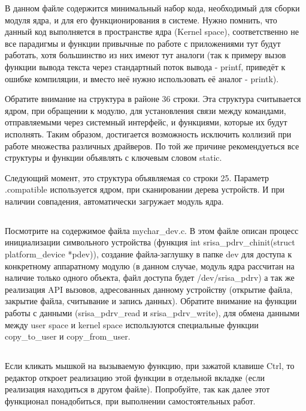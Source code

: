 В данном файле содержится минимальный набор кода, необходимый для сборки модуля ядра, и для его функционирования в системе. Нужно помнить, что данный код выполняется в пространстве ядра (Kernel space), соответственно не все парадигмы и функции привычные по работе с приложениями тут будут работать, хотя большинство из них имеют тут аналоги (так к примеру вызов функции вывода текста через стандартный поток вывода - printf, приведёт к ошибке компиляции, и вместо неё нужно использовать её аналог - printk).

Обратите внимание на структура в районе 36 строки. Эта структура считывается ядром, при обращении к модулю, для установления связи между командами, отправляемыми через системный интерфейс, и функциями, которые их будут исполнять. Таким образом, достигается возможность исключить коллизий при работе множества различных драйверов. По той же причине рекомендуеться  все структуры и функции объявлять с ключевым словом static.

Следующий момент, это структура объявляемая со строки 25. Параметр .compatible используется ядром, при сканировании дерева устройств. И при наличии совпадения, автоматически загружает модуль ядра.  

\subsection{}Посмотрите на содержимое файла mychar\_dev.c. В этом файле описан процесс инициализации символьного устройства (функция int srisa\_pdrv\_chinit(struct platform\_device *pdev)), создание файла-заглушку в папке dev для доступа к конкретному аппаратному модулю (в данном случае, модуль ядра рассчитан на наличие только одного объекта, файл доступа будет /dev/srisa\_pdrv) а так же реализация API вызовов, адресованных данному устройству (открытие файла, закрытие файла, считывание и запись данных).
Обратите внимание на функции работы с данными (srisa\_pdrv\_read и srisa\_pdrv\_write), для обмена данными между user space и kernel space используются специальные функции copy\_to\_user и copy\_from\_user.

\subsection{}Если кликать мышкой на вызываемую функцию, при зажатой клавише Ctrl, то редактор откроет реализацию этой функции в отдельной вкладке (если реализация находиться в другом файле). Попробуйте, так как далее этот функционал понадобиться, при выполнении самостоятельных работ.

